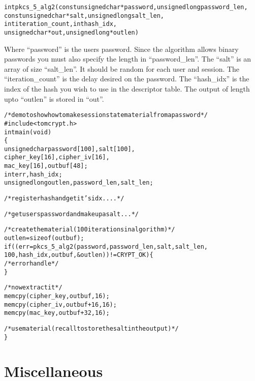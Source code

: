\documentclass[a4paper]{book}
\begin{document}
\begin{alltt}
int pkcs_5_alg2(const unsigned char *password, unsigned long password_len, 
                const unsigned char *salt,     unsigned long salt_len,
                int iteration_count,           int hash_idx,
                unsigned char *out,            unsigned long *outlen)
\end{alltt}
Where ``password'' is the users password.  Since the algorithm allows binary passwords you must also specify the length in ``password\_len''.  
The ``salt'' is an array of size ``salt\_len''.  It should be random for each user and session.  The ``iteration\_count'' is the delay desired
on the password.  The ``hash\_idx'' is the index of the hash you wish to use in the descriptor table.   The output of length upto 
``outlen'' is stored in ``out''.

\begin{alltt}
/* demo to show how to make session state material from a password */
#include <tomcrypt.h>
int main(void)
\{
    unsigned char password[100], salt[100],
                  cipher_key[16], cipher_iv[16],
                  mac_key[16], outbuf[48];
    int           err, hash_idx;
    unsigned long outlen, password_len, salt_len;

    /* register hash and get it's idx .... */

    /* get users password and make up a salt ... */

    /* create the material (100 iterations in algorithm) */
    outlen = sizeof(outbuf);
    if ((err = pkcs_5_alg2(password, password_len, salt, salt_len, 
                           100, hash_idx, outbuf, &outlen)) != CRYPT_OK) \{
       /* error handle */
    \}

    /* now extract it */
    memcpy(cipher_key, outbuf, 16);
    memcpy(cipher_iv,  outbuf+16, 16);
    memcpy(mac_key,    outbuf+32, 16);

    /* use material (recall to store the salt in the output) */
\}
\end{alltt}


\chapter{Miscellaneous}
\end{document}
